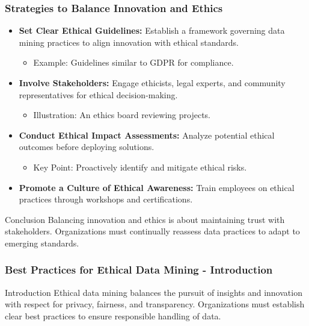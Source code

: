 \documentclass{beamer}
\begin{document}
\begin{frame}[fragile]
    \frametitle{Strategies to Balance Innovation and Ethics}
    \begin{itemize}
        \item \textbf{Set Clear Ethical Guidelines:} Establish a framework governing data mining practices to align innovation with ethical standards.
            \begin{itemize}
                \item Example: Guidelines similar to GDPR for compliance.
            \end{itemize}
        
        \item \textbf{Involve Stakeholders:} Engage ethicists, legal experts, and community representatives for ethical decision-making.
            \begin{itemize}
                \item Illustration: An ethics board reviewing projects.
            \end{itemize}

        \item \textbf{Conduct Ethical Impact Assessments:} Analyze potential ethical outcomes before deploying solutions.
            \begin{itemize}
                \item Key Point: Proactively identify and mitigate ethical risks.
            \end{itemize}

        \item \textbf{Promote a Culture of Ethical Awareness:} Train employees on ethical practices through workshops and certifications.
    \end{itemize}

    \begin{block}{Conclusion}
        Balancing innovation and ethics is about maintaining trust with stakeholders. Organizations must continually reassess data practices to adapt to emerging standards.
    \end{block}
\end{frame}

\begin{frame}[fragile]
    \frametitle{Best Practices for Ethical Data Mining - Introduction}
    \begin{block}{Introduction}
        Ethical data mining balances the pursuit of insights and innovation with respect for privacy, fairness, and transparency. Organizations must establish clear best practices to ensure responsible handling of data.
    \end{block}
\end{frame}
\end{document}

